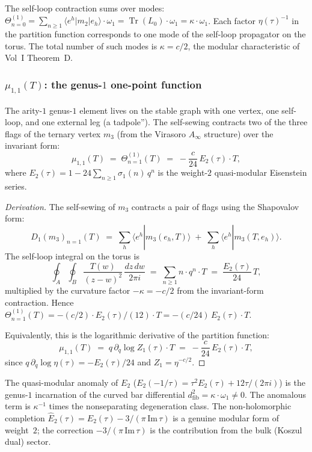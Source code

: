 \documentclass[11pt]{article}
\begin{document}
\begin{remark}
The self-loop contraction sums over modes:
$\Theta^{(1)}_{n=0} = \sum_{n \geq 1} \langle e^h | m_2 | e_h \rangle
\cdot \omega_1 = \operatorname{Tr}(L_0) \cdot \omega_1 =
\kappa \cdot \omega_1$.
Each factor $\eta(\tau)^{-1}$ in the partition function corresponds
to one mode of the self-loop propagator on the torus.  The total
number of such modes is $\kappa = c/2$, the modular characteristic
of Vol~I Theorem~D.
\end{remark}

\subsubsection{$\mu_{1,1}(T)$: the genus-$1$ one-point function}

The arity-$1$ genus-$1$ element lives on the stable graph with one
vertex, one self-loop, and one external leg (a tadpole'').  The
self-sewing contracts two of the three flags of the ternary vertex $m_3$
(from the Virasoro $A_\infty$ structure) over the invariant form:
\begin{equation}\label{eq:wn-mu11}
\mu_{1,1}(T)
\;=\;
\Theta^{(1)}_{n=1}(T)
\;=\;
-\frac{c}{24}\,E_2(\tau)\cdot T,
\end{equation}
where $E_2(\tau) = 1 - 24\sum_{n \geq 1}\sigma_1(n)\,q^n$ is the
weight-$2$ quasi-modular Eisenstein series.

\begin{proof}[Derivation]
The self-sewing of $m_3$ contracts a pair of flags using the
Shapovalov form:
\[
D_1(m_3)_{n=1}(T)
\;=\;
\sum_{h} \langle e^h | m_3(e_h, T) \rangle
\;+\;
\sum_{h} \langle e^h | m_3(T, e_h) \rangle.
\]
The self-loop integral on the torus is
\[
\oint_A \oint_B \frac{T(w)}{(z-w)^2}\,\frac{dz\,dw}{2\pi i}
\;=\;
\sum_{n \geq 1} n\cdot q^n \cdot T
\;=\;
\frac{E_2(\tau)}{24}\,T,
\]
multiplied by the curvature factor $-\kappa = -c/2$ from the
invariant-form contraction.  Hence
$\Theta^{(1)}_{n=1}(T) = -(c/2)\cdot E_2(\tau)/(12)\cdot T =
-(c/24)\,E_2(\tau) \cdot T$.

Equivalently, this is the logarithmic derivative of the partition
function:
\[
\mu_{1,1}(T)
\;=\;
q\,\partial_q \log Z_1(\tau) \cdot T
\;=\;
-\frac{c}{24}\,E_2(\tau) \cdot T,
\]
since $q\,\partial_q\log\eta(\tau) = -E_2(\tau)/24$
and $Z_1 = \eta^{-c/2}$.
\end{proof}

\begin{remark}
The quasi-modular anomaly of $E_2$
($E_2(-1/\tau) = \tau^2 E_2(\tau) + 12\tau/(2\pi i)$)
is the genus-$1$ incarnation of the curved bar differential
$d_{\mathrm{fib}}^2 = \kappa \cdot \omega_1 \neq 0$.
The anomalous term is $\kappa^{-1}$ times the nonseparating
degeneration class.  The non-holomorphic completion
$\widehat{E}_2(\tau) = E_2(\tau) - 3/(\pi\,\mathrm{Im}\,\tau)$
is a genuine modular form of weight~$2$; the correction
$-3/(\pi\,\mathrm{Im}\,\tau)$ is the contribution from the
bulk (Koszul dual) sector.
\end{remark}
\end{document}

